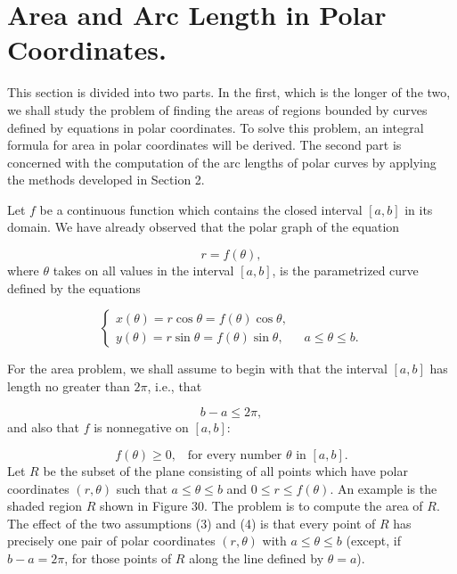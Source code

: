 \section{Area and Arc Length in Polar Coordinates.} This section is divided into two parts. In the first, which is the longer of the two, we shall study the problem of finding the areas of regions bounded by curves defined by equations in polar coordinates. To solve this problem, an integral formula for area in polar coordinates will be derived. The second part is concerned with the computation of the arc lengths of polar curves by applying the methods developed in Section 2.

Let $f$ be a continuous function which contains the closed interval $[a, b]$ in its domain. We have already observed that the polar graph of the equation

\begin{equation}
r = f(\theta),  
\label{eq10.7.1}
\end{equation}
\noindent where $\theta$ takes on all values in the interval $[a, b]$, is the parametrized curve defined by the equations

\begin{equation}
\left \{ \begin{array}{ll}
x(\theta) = r \cos \theta = f(\theta) \cos \theta,       &\\
y(\theta) = r \sin \theta = f(\theta) \sin \theta,  \;\;\; &a \leq \theta \leq b.
\end{array}
\right .
\label{eq10.7.2}
\end{equation}

For the area problem, we shall assume to begin with that the interval $[a, b]$ has length no greater than $2\pi$, i.e., that

\begin{equation}
b - a  \leq 2\pi, 
\label{eq10.7.3}
\end{equation}
\noindent and also that $f$ is nonnegative on $[a, b]$: 

\begin{equation}
f(\theta) \geq 0, \;\;\;\mbox{for every number $\theta$ in $[a, b]$.}  
\label{eq10.7.4}
\end{equation}
\noindent Let $R$ be the subset of the plane consisting of all points which have polar coordinates $(r, \theta)$ such that $a \leq \theta \leq b$ and $0 \leq r \leq f(\theta)$. An example is the shaded region $R$ shown in Figure 30. The problem is to compute the area of $R$. The effect of the two assumptions (3) and (4) is that every point of $R$ has precisely one pair of polar coordinates $(r, \theta)$ with $a \leq \theta \leq b$ (except, if $b - a = 2\pi$, for those points of $R$ along the line defined by $\theta = a$).

